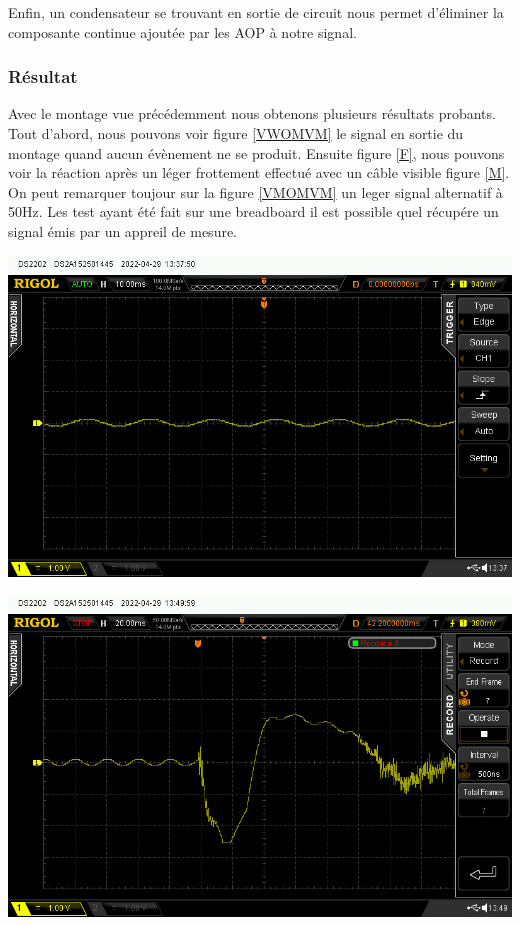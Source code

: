\documentclass[12pt,french,a4paper]{article}
\begin{document}
Enfin, un condensateur se trouvant en sortie de circuit nous permet d’éliminer la composante continue ajoutée par les AOP à notre signal.


\subsubsection{Résultat}
Avec le montage vue précédemment nous obtenons plusieurs résultats probants.
Tout d'abord, nous pouvons voir figure \ref{VWOMVM} le signal en sortie du montage quand aucun évènement ne se produit.
Ensuite figure \ref{F}, nous pouvons voir la réaction après un léger frottement effectué avec un câble visible figure \ref{M}. 
On peut remarquer toujour sur la figure \ref{VMOMVM} un leger signal alternatif à 50Hz. Les test ayant été fait sur une breadboard il est possible quel récupére un signal émis par un appreil de mesure.

\begin{center}	
\includegraphics[scale=0.5]{../img/plat.jpg}
\label{VWOMVM}
\end{center}

\begin{center}	
\includegraphics[scale=0.5]{../img/frotment.jpg}
\label{F}
\end{center}
\end{document}

